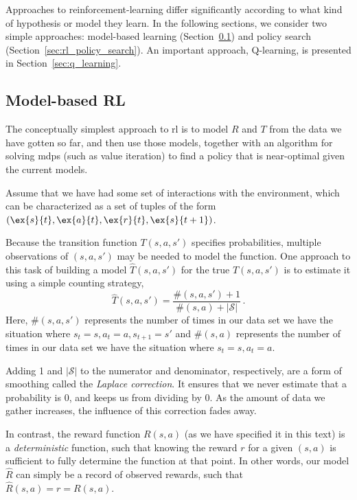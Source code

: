 Approaches to reinforcement-learning differ significantly according to
what kind of hypothesis or model they learn.  In the following
sections, we consider two simple approaches: model-based learning
(Section~\ref{sec:rl_model_based}) and policy search
(Section~\ref{sec:rl_policy_search}).  An important
approach, Q-learning, is presented in Section~\ref{sec:q_learning}.

\subsection{Model-based RL}
\label{sec:rl_model_based}

The conceptually simplest approach to {\sc rl} is to model $R$ and
$T$ from the data we have gotten so far, and then use those models,
together with an algorithm for solving {\sc mdp}s (such as value
iteration) to find a policy that is near-optimal given the current
models.

Assume that we have had some set of interactions with the environment,
which can be characterized as a set of tuples of the form $(\ex{s}{t}, \ex{a}{t}, \ex{r}{t}, \ex{s}{t+1})$.

Because the transition function ${T}(s, a, s')$ specifies
probabilities, multiple observations of $(s, a, s')$ may be needed to
model the function.  One approach to this task of building a model
$\hat{T}(s, a, s')$ for the true ${T}(s,a,s')$ is to estimate it using
a simple counting strategy,
\begin{equation}
  \hat{T}(s,a,s') = \frac{\#(s,a,s') + 1}{\#(s,a) + \left|
      \mathcal{S}\right|}
\,.  
\end{equation}
Here, $\#(s, a, s')$ represents the
number of times in our data set we have the situation where
$s_t = s, a_t = a, s_{t+1} = s'$ and $\#(s, a)$ represents the number
of times in our data set we have the situation where
$s_t = s, a_t = a$.  

Adding 1 and $\left|\mathcal{S}\right|$ to the numerator and
denominator, respectively, are a form of smoothing called the {\em
  Laplace correction}. It ensures that we never estimate that a
probability is 0, and keeps us from dividing by 0.  As the amount of
data we gather increases, the influence of this correction fades away.

In contrast, the reward function ${R}(s, a)$ (as we have specified it
in this text) is a {\em deterministic} function, such that knowing the
reward $r$ for a given $(s, a)$ is sufficient to fully determine the
function at that point.  In other words, our model $\hat{R}$ can simply be
a record of observed rewards, such that $\hat{R}(s, a) = r = R(s,a)$.

